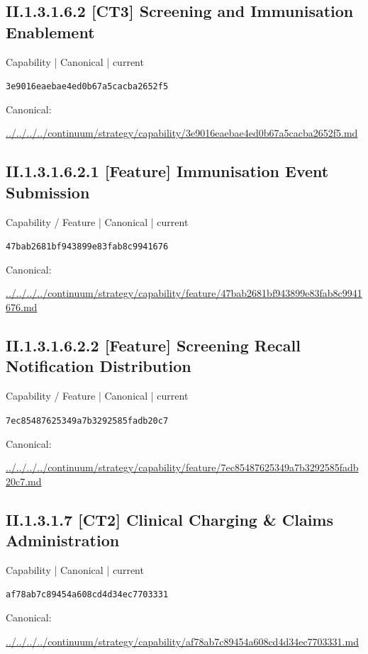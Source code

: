 \documentclass[10pt,a4paper]{article}
\begin{document}
\subsection*{II.1.3.1.6.2 [CT3] Screening and Immunisation Enablement}
{\small Capability | Canonical | current}\par
\texttt{3e9016eaebae4ed0b67a5cacba2652f5}\par
Canonical: \par
{\footnotesize\url{../../../../continuum/strategy/capability/3e9016eaebae4ed0b67a5cacba2652f5.md}}\par
\subsection*{II.1.3.1.6.2.1 [Feature] Immunisation Event Submission}
{\small Capability / Feature | Canonical | current}\par
\texttt{47bab2681bf943899e83fab8c9941676}\par
Canonical: \par
{\footnotesize\url{../../../../continuum/strategy/capability/feature/47bab2681bf943899e83fab8c9941676.md}}\par
\subsection*{II.1.3.1.6.2.2 [Feature] Screening Recall Notification Distribution}
{\small Capability / Feature | Canonical | current}\par
\texttt{7ec85487625349a7b3292585fadb20c7}\par
Canonical: \par
{\footnotesize\url{../../../../continuum/strategy/capability/feature/7ec85487625349a7b3292585fadb20c7.md}}\par
\subsection*{II.1.3.1.7 [CT2] Clinical Charging \& Claims Administration}
{\small Capability | Canonical | current}\par
\texttt{af78ab7c89454a608cd4d34ec7703331}\par
Canonical: \par
{\footnotesize\url{../../../../continuum/strategy/capability/af78ab7c89454a608cd4d34ec7703331.md}}\par
\end{document}
